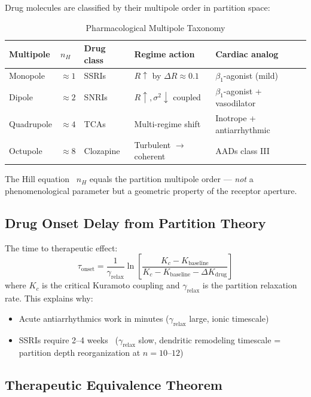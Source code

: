 \documentclass[10pt,twocolumn,a4paper]{article}
\theoremstyle{definition}
\begin{document}
Drug molecules are classified by their multipole order in partition space:

\begin{table}[H]
\centering
\caption{Pharmacological Multipole Taxonomy}
\label{tab:pharma}
\begin{tabular}{lllll}
\toprule
\textbf{Multipole} & \textbf{$n_H$} & \textbf{Drug class} & \textbf{Regime action} & \textbf{Cardiac analog}\\
\midrule
Monopole & $\approx 1$ & SSRIs & $R\uparrow$ by $\Delta R \approx 0.1$ & $\beta_1$-agonist (mild)\\
Dipole & $\approx 2$ & SNRIs & $R\uparrow, \sigma^2\downarrow$ coupled & $\beta_1$-agonist + vasodilator\\
Quadrupole & $\approx 4$ & TCAs & Multi-regime shift & Inotrope + antiarrhythmic\\
Octupole & $\approx 8$ & Clozapine & Turbulent $\to$ coherent & AADs class III\\
\bottomrule
\end{tabular}
\end{table}

The Hill equation~\cite{hill1910possible,weiss1997hill} $n_H$ equals the partition multipole order --- \emph{not}
a phenomenological parameter but a geometric property of the receptor aperture.

\subsection{Drug Onset Delay from Partition Theory}

The time to therapeutic effect:
\begin{equation}
\tau_{\text{onset}} = \frac{1}{\gamma_{\text{relax}}} \ln\left[\frac{K_c - K_{\text{baseline}}}{K_c - K_{\text{baseline}} - \Delta K_{\text{drug}}}\right]
\end{equation}
where $K_c$ is the critical Kuramoto coupling and $\gamma_{\text{relax}}$
is the partition relaxation rate. This explains why:
\begin{itemize}
\item Acute antiarrhythmics work in minutes ($\gamma_{\text{relax}}$ large,
  ionic timescale)
\item SSRIs require 2--4 weeks~\cite{frazer2001ssri,stahl2013essential} ($\gamma_{\text{relax}}$ slow,
  dendritic remodeling timescale = partition depth reorganization at $n = 10$--$12$)
\end{itemize}

\subsection{Therapeutic Equivalence Theorem}
\end{document}
